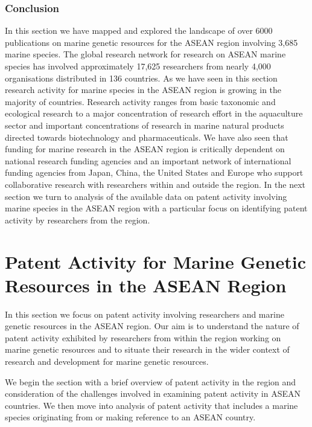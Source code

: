 \documentclass[]{book}
\theoremstyle{definition}
\theoremstyle{definition}
\theoremstyle{definition}
\theoremstyle{remark}
\begin{document}
\hypertarget{conclusion-1}{%
\subsection{Conclusion}\label{conclusion-1}}

In this section we have mapped and explored the landscape of over 6000
publications on marine genetic resources for the ASEAN region involving
3,685 marine species. The global research network for research on ASEAN
marine species has involved approximately 17,625 researchers from nearly
4,000 organisations distributed in 136 countries. As we have seen in
this section research activity for marine species in the ASEAN region is
growing in the majority of countries. Research activity ranges from
basic taxonomic and ecological research to a major concentration of
research effort in the aquaculture sector and important concentrations
of research in marine natural products directed towards biotechnology
and pharmaceuticals. We have also seen that funding for marine research
in the ASEAN region is critically dependent on national research funding
agencies and an important network of international funding agencies from
Japan, China, the United States and Europe who support collaborative
research with researchers within and outside the region. In the next
section we turn to analysis of the available data on patent activity
involving marine species in the ASEAN region with a particular focus on
identifying patent activity by researchers from the region.

\hypertarget{patent}{%
\chapter{Patent Activity for Marine Genetic Resources in the ASEAN
Region}\label{patent}}

In this section we focus on patent activity involving researchers and
marine genetic resources in the ASEAN region. Our aim is to understand
the nature of patent activity exhibited by researchers from within the
region working on marine genetic resources and to situate their research
in the wider context of research and development for marine genetic
resources.

We begin the section with a brief overview of patent activity in the
region and consideration of the challenges involved in examining patent
activity in ASEAN countries. We then move into analysis of patent
activity that includes a marine species originating from or making
reference to an ASEAN country.
\end{document}
